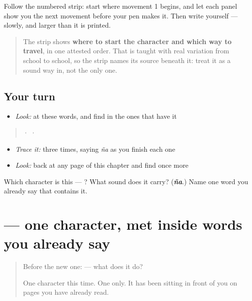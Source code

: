 Follow the numbered strip: start where movement 1 begins, and let each panel show you the next movement before your pen makes it. Then write  yourself — slowly, and larger than it is printed.

\begin{quote}
The strip shows \textbf{where to start the character and which way to travel}, in one attested order. That is taught with real variation from school to school, so the strip names its source beneath it: treat it as a sound way in, not the only one.
\end{quote}

\subsection*{Your turn}
\begin{itemize}
\raggedright
  \item \emph{Look:} at these words, and find  in the ones that have it
\end{itemize}

\begin{quote}
  ·    ·  
\end{quote}

\begin{itemize}
\raggedright
  \item \emph{Trace it:}  three times, saying \emph{ña} as you finish each one
  \item \emph{Look:} back at any page of this chapter and find  once more
\end{itemize}

\begin{tcolorbox}[breakable,colback=teal!4,colframe=teal!35!black,title={Before you move on}]
Which character is this — ? What sound does it carry? (\emph{\textbf{ña}}.) Name one word you already say that contains it.
\end{tcolorbox}
\section[\texorpdfstring{\ml{ൻ} (n)}{ൻ (n)}]{ — one character, met inside words you already say}

\label{lesson:ML-S142-chillu-n}



\begin{quote}
Before the new one:  — what does it do?

One character this time. One only. It has been sitting in front of you on pages you have already read.
\end{quote}

